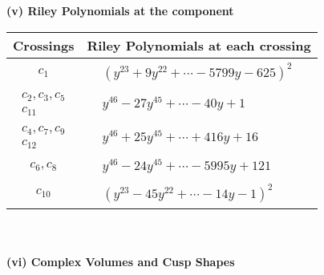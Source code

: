 \documentclass[1p]{elsarticle_modified}
\theoremstyle{definition}
\begin{document}
\flushleft \textbf{(v) Riley Polynomials at the component}\newline \\
\begin{tabular}{m{50pt}|m{274pt}}
Crossings & \hspace{64pt}Riley Polynomials at each crossing \\
\hline $$\begin{aligned}c_{1}\end{aligned}$$&$\begin{aligned}
&(y^{23}+9 y^{22}+\cdots-5799 y-625)^{2}
\end{aligned}$\\
\hline $$\begin{aligned}c_{2},c_{3},c_{5}\\c_{11}\end{aligned}$$&$\begin{aligned}
&y^{46}-27 y^{45}+\cdots-40 y+1
\end{aligned}$\\
\hline $$\begin{aligned}c_{4},c_{7},c_{9}\\c_{12}\end{aligned}$$&$\begin{aligned}
&y^{46}+25 y^{45}+\cdots+416 y+16
\end{aligned}$\\
\hline $$\begin{aligned}c_{6},c_{8}\end{aligned}$$&$\begin{aligned}
&y^{46}-24 y^{45}+\cdots-5995 y+121
\end{aligned}$\\
\hline $$\begin{aligned}c_{10}\end{aligned}$$&$\begin{aligned}
&(y^{23}-45 y^{22}+\cdots-14 y-1)^{2}
\end{aligned}$\\
\hline
\end{tabular}\\~\\
\newpage\flushleft \textbf{(vi) Complex Volumes and Cusp Shapes}
\end{document}
